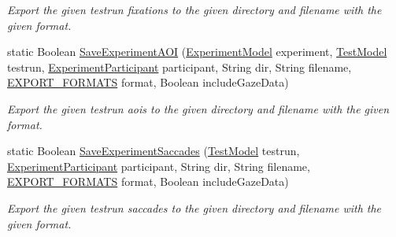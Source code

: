 \begin{DoxyCompactItemize}
\begin{DoxyCompactList}\small\item\em Export the given testrun fixations to the given directory and filename with the given format. \end{DoxyCompactList}\item 
static Boolean \hyperlink{class_web_analyzer_1_1_controller_1_1_export_controller_a3bf67d51c5be3abf110a145a472049f8}{Save\+Experiment\+A\+O\+I} (\hyperlink{class_web_analyzer_1_1_models_1_1_base_1_1_experiment_model}{Experiment\+Model} experiment, \hyperlink{class_web_analyzer_1_1_models_1_1_data_model_1_1_test_model}{Test\+Model} testrun, \hyperlink{class_web_analyzer_1_1_models_1_1_base_1_1_experiment_participant}{Experiment\+Participant} participant, String dir, String filename, \hyperlink{class_web_analyzer_1_1_controller_1_1_export_controller_a8cea4a311ecaf495f305f9d7829a57aa}{E\+X\+P\+O\+R\+T\+\_\+\+F\+O\+R\+M\+A\+T\+S} format, Boolean include\+Gaze\+Data)
\begin{DoxyCompactList}\small\item\em Export the given testrun aois to the given directory and filename with the given format. \end{DoxyCompactList}\item 
static Boolean \hyperlink{class_web_analyzer_1_1_controller_1_1_export_controller_a9c72f57f079de884e7e029abf4283e41}{Save\+Experiment\+Saccades} (\hyperlink{class_web_analyzer_1_1_models_1_1_data_model_1_1_test_model}{Test\+Model} testrun, \hyperlink{class_web_analyzer_1_1_models_1_1_base_1_1_experiment_participant}{Experiment\+Participant} participant, String dir, String filename, \hyperlink{class_web_analyzer_1_1_controller_1_1_export_controller_a8cea4a311ecaf495f305f9d7829a57aa}{E\+X\+P\+O\+R\+T\+\_\+\+F\+O\+R\+M\+A\+T\+S} format, Boolean include\+Gaze\+Data)
\begin{DoxyCompactList}\small\item\em Export the given testrun saccades to the given directory and filename with the given format. \end{DoxyCompactList}\end{DoxyCompactItemize}

